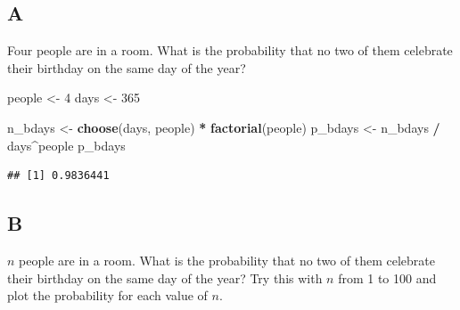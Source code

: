 \documentclass[
]{article}
\newenvironment{Shaded}{\begin{snugshade}}{\end{snugshade}}
\newcommand{\DecValTok}[1]{\textcolor[rgb]{0.00,0.00,0.81}{#1}}
\newcommand{\KeywordTok}[1]{\textcolor[rgb]{0.13,0.29,0.53}{\textbf{#1}}}
\newcommand{\NormalTok}[1]{#1}
\newcommand{\OperatorTok}[1]{\textcolor[rgb]{0.81,0.36,0.00}{\textbf{#1}}}
\newcommand{\StringTok}[1]{\textcolor[rgb]{0.31,0.60,0.02}{#1}}
\begin{document}
\hypertarget{a-4}{%
\subsection{A}\label{a-4}}

Four people are in a room. What is the probability that no two of them
celebrate their birthday on the same day of the year?

\begin{Shaded}
\begin{Highlighting}[]
\NormalTok{people \textless{}{-}}\StringTok{ }\DecValTok{4}
\NormalTok{days \textless{}{-}}\StringTok{ }\DecValTok{365}

\NormalTok{n\_bdays \textless{}{-}}\StringTok{ }\KeywordTok{choose}\NormalTok{(days, people) }\OperatorTok{*}\StringTok{ }\KeywordTok{factorial}\NormalTok{(people)}
\NormalTok{p\_bdays \textless{}{-}}\StringTok{ }\NormalTok{n\_bdays }\OperatorTok{/}\StringTok{ }\NormalTok{days}\OperatorTok{\^{}}\NormalTok{people}
\NormalTok{p\_bdays}
\end{Highlighting}
\end{Shaded}

\begin{verbatim}
## [1] 0.9836441
\end{verbatim}

\hypertarget{b-4}{%
\subsection{B}\label{b-4}}

\(n\) people are in a room. What is the probability that no two of them
celebrate their birthday on the same day of the year? Try this with
\(n\) from 1 to 100 and plot the probability for each value of \(n\).
\end{document}
